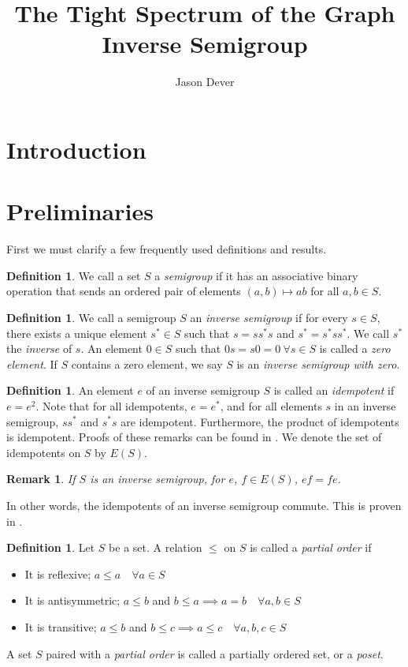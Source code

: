 \documentclass[12pt]{article}
\title{The Tight Spectrum of the Graph Inverse Semigroup}
\author{Jason Dever}
\newtheorem{remark}[theorem]{Remark}
\theoremstyle{definition}
\newtheorem{definition}[theorem]{Definition}
\begin{document}
\date{}
\maketitle

\section{Introduction}
\section{Preliminaries}
First we must clarify a few frequently used definitions and results.

\begin{definition}
    We call a set $S$ a \emph{semigroup} if it has an associative binary operation
    that sends an ordered pair of elements $(a, b) \mapsto ab$ for all $a, b \in S$.
\end{definition}

\begin{definition}
    We call a semigroup $S$ an \emph{inverse semigroup} if for every $s \in S$, there exists a unique
    element $s^* \in S$ such that $s = ss^*s$ and $s^* = s^*ss^*$. We call $s^*$ the \emph{inverse} of $s$.
    An element $0 \in S$ such that $0s = s0 = 0 \ \forall s \in S$ is called a \emph{zero element}.
    If $S$ contains a zero element, we say $S$ is an \emph{inverse semigroup with zero}.
\end{definition}

\begin{definition}
    An element $e$ of an inverse semigroup $S$ is called an \emph{idempotent} if
    $e = e^2$. Note that for all idempotents, $e = e^*$, and for all elements $s$ in
    an inverse semigroup, $ss^*$ and $s^*s$ are idempotent. Furthermore, 
    the product of idempotents is idempotent. Proofs of these remarks can be found
    in \parencite[Section 3]{cheaney}. We denote the set of idempotents on $S$ by $E(S)$.
\end{definition}

\begin{remark}
    If $S$ is an inverse semigroup, for $e$, $f \in E(S)$, $ef = fe$.
\end{remark}
In other words, the idempotents of an inverse semigroup commute. This is proven
in \parencite[Theorem 3.2]{cheaney}.

\begin{definition}
    Let $S$ be a set. A relation $\leq$ on $S$ is called a \emph{partial order} if
    \begin{itemize}
        \item It is reflexive; $a \leq a \quad \forall a \in S$
        \item It is antisymmetric; $a \leq b$ and $b \leq a \implies a = b \quad \forall a, b \in S$
        \item It is transitive; $a \leq b$ and $b \leq c \implies a \leq c \quad \forall a, b, c \in S$
    \end{itemize}
    A set $S$ paired with a \emph{partial order} is called a partially ordered set, or a \emph{poset}.
\end{definition}
\end{document}
